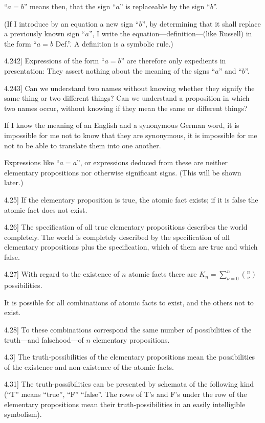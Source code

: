\documentclass[12pt,oneside]{book}[2007/10/19]
\newcommand{\PropositionE}[2]{%
  \item[\phantomsection\label{PropE:#1}\PropGRef{#1}] #2%
}
\newcommand{\PropGRef}[1]{\hyperref[PropG:#1]{#1}}
\begin{document}
\begin{propositions}
{``$a = b$'' means then, that the sign ``$a$'' is
replaceable by the sign ``$b$''.

(If I introduce by an equation a new sign ``$b$'',
by determining that it shall replace a previously
known sign ``$a$'', I write the equation---definition---(like
Russell) in the form ``$a = b$ Def.''. A
definition is a symbolic rule.)}


\PropositionE{4.242}
{Expressions of the form ``$a = b$'' are therefore only
expedients in presentation: They assert nothing
about the meaning of the signs ``$a$'' and ``$b$''.}


\PropositionE{4.243}
{Can we understand two names without knowing
whether they signify the same thing or two
different things? Can we understand a proposition
in which two names occur, without knowing if they
mean the same or different things?

If I know the meaning of an English and a
synonymous German word, it is impossible for
me not to know that they are synonymous, it is
impossible for me not to be able to translate them
into one another.

Expressions like ``$a = a$'', or expressions
deduced from these are neither elementary propositions
nor otherwise significant signs. (This
will be shown later.)}


\PropositionE{4.25}
{If the elementary proposition is true, the atomic
fact exists; if it is false the atomic fact does not
exist.}


\PropositionE{4.26}
{The specification of all true elementary propositions
describes the world completely. The
world is completely described by the specification
of all elementary propositions plus the specification,
which of them are true and which false.}


\PropositionE{4.27}
{With regard to the existence of $n$ atomic facts
there are $K_{n} = \sum\limits_{\nu = 0}^n\binom{n}{\nu}$ possibilities.

It is possible for all combinations of atomic
facts to exist, and the others not to exist.}


\PropositionE{4.28}
{To these combinations correspond the same
number of possibilities of the truth---and falsehood---of
$n$ elementary propositions.}


\PropositionE{4.3}
{The truth-possibilities of the elementary propositions
mean the possibilities of the existence
and non-existence of the atomic facts.}


\PropositionE{4.31}
{The truth-possibilities can be presented by
schemata of the following kind (``T'' means
``true'', ``F'' ``false''. The rows of T's and F's
under the row of the elementary propositions mean
their truth-possibilities in an easily intelligible
symbolism).

}
\end{propositions}
\end{document}
